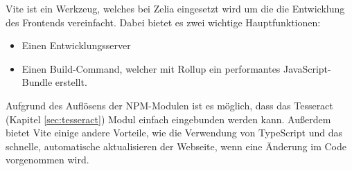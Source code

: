 

Vite ist ein Werkzeug, welches bei Zelia eingesetzt wird um die die Entwicklung des Frontends vereinfacht. Dabei bietet es zwei wichtige Hauptfunktionen\cite{ViteOverview}:

\begin{itemize}
    \item Einen Entwicklungsserver
    \item Einen Build-Command, welcher mit Rollup ein performantes JavaScript-Bundle erstellt.
\end{itemize}




Aufgrund des Auflösens der NPM-Modulen ist es möglich, dass das Tesseract (Kapitel \ref{sec:tesseract}) Modul einfach eingebunden werden kann. Außerdem bietet Vite einige andere Vorteile, wie die Verwendung von TypeScript und das schnelle, automatische aktualisieren der Webseite, wenn eine Änderung im Code vorgenommen wird.